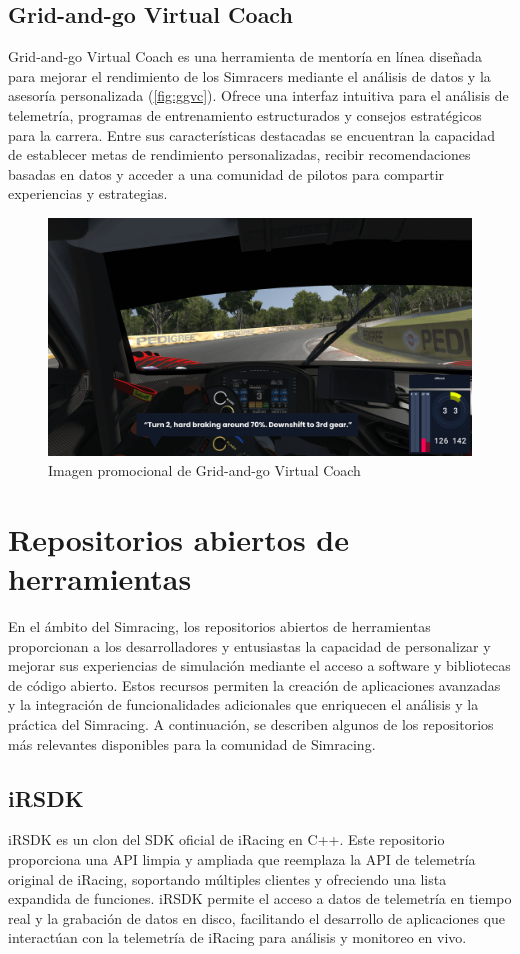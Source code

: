 \subsection{Grid-and-go Virtual Coach}
Grid-and-go Virtual Coach \cite{gg_vc} es una herramienta de mentoría en línea diseñada para mejorar el rendimiento de los Simracers mediante el análisis de datos y la asesoría personalizada (\autoref{fig:ggvc}). Ofrece una interfaz intuitiva para el análisis de telemetría, programas de entrenamiento estructurados y consejos estratégicos para la carrera. Entre sus características destacadas se encuentran la capacidad de establecer metas de rendimiento personalizadas, recibir recomendaciones basadas en datos y acceder a una comunidad de pilotos para compartir experiencias y estrategias.
\begin{figure}[H]
	\centering
	\includegraphics[width=0.6\linewidth]{./figs/herramientas/mentor_virtual/gg_virtual_coach.png}
	\caption[Imagen promocional de Grid-and-go Virtual Coach]{Imagen promocional de Grid-and-go Virtual Coach \cite{gg_vc_cap}}
    \label{fig:ggvc}
\end{figure}

\section{Repositorios abiertos de herramientas}
En el ámbito del Simracing, los repositorios abiertos de herramientas proporcionan a los desarrolladores y entusiastas la capacidad de personalizar y mejorar sus experiencias de simulación mediante el acceso a software y bibliotecas de código abierto. Estos recursos permiten la creación de aplicaciones avanzadas y la integración de funcionalidades adicionales que enriquecen el análisis y la práctica del Simracing. A continuación, se describen algunos de los repositorios más relevantes disponibles para la comunidad de Simracing.

\subsection{iRSDK}
iRSDK \cite{irsdk} es un clon del SDK oficial de iRacing en C++. Este repositorio proporciona una API limpia y ampliada que reemplaza la API de telemetría original de iRacing, soportando múltiples clientes y ofreciendo una lista expandida de funciones. iRSDK permite el acceso a datos de telemetría en tiempo real y la grabación de datos en disco, facilitando el desarrollo de aplicaciones que interactúan con la telemetría de iRacing para análisis y monitoreo en vivo.

